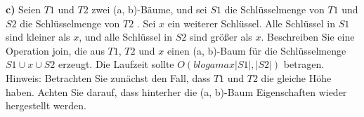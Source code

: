 	


\noindent
\textbf{c)} Seien $T1$ und $T2$ zwei (a, b)-Bäume, und sei $S1$ die Schlüsselmenge von $T1$ und $S2$ die Schlüsselmenge von $T2$ . Sei $x$ ein weiterer Schlüssel. Alle Schlüssel in $S1$ sind kleiner als $x$, und alle Schlüssel in $S2$ sind größer als $x$. Beschreiben Sie eine Operation join, die aus $T1$, $T2$ und $x$ einen (a, b)-Baum für die Schlüsselmenge $S1 \cup {x} \cup S2$ erzeugt. Die Laufzeit sollte $O(b loga max{|S1|, |S2|})$ betragen. Hinweis: Betrachten Sie zunächst den Fall, dass $T1$ und $T2$ die gleiche Höhe haben. Achten Sie darauf, dass hinterher die (a, b)-Baum Eigenschaften wieder hergestellt werden.